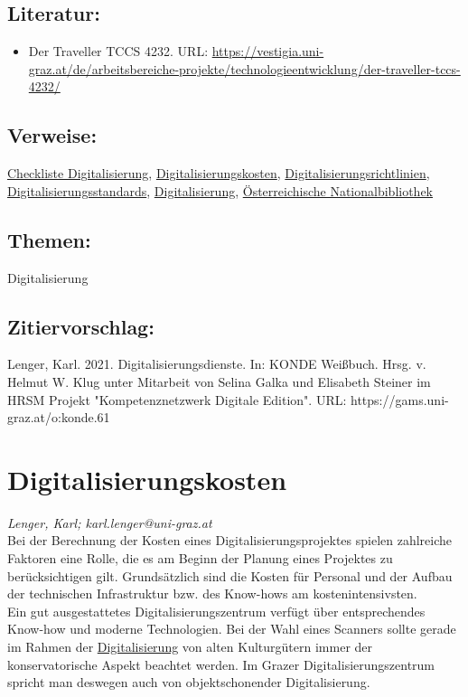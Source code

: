 \documentclass{article}
\begin{document}
        \subsection*{Literatur:}\begin{itemize}\item Der Traveller TCCS 4232. URL: \url{https://vestigia.uni-graz.at/de/arbeitsbereiche-projekte/technologieentwicklung/der-traveller-tccs-4232/}\end{itemize}\subsection*{Verweise:}\href{https://gams.uni-graz.at/o:konde.40}{Checkliste Digitalisierung}, \href{https://gams.uni-graz.at/o:konde.62}{Digitalisierungskosten}, \href{https://gams.uni-graz.at/o:konde.63}{Digitalisierungsrichtlinien}, \href{https://gams.uni-graz.at/o:konde.64}{Digitalisierungsstandards}, \href{https://gams.uni-graz.at/o:konde.60}{Digitalisierung}, \href{https://gams.uni-graz.at/o:konde.153}{Österreichische Nationalbibliothek}\subsection*{Themen:}Digitalisierung\subsection*{Zitiervorschlag:}Lenger, Karl. 2021. Digitalisierungsdienste. In: KONDE Weißbuch. Hrsg. v. Helmut W. Klug unter Mitarbeit von Selina Galka und Elisabeth Steiner im HRSM Projekt "Kompetenznetzwerk Digitale Edition". URL: https://gams.uni-graz.at/o:konde.61\newpage\section*{Digitalisierungskosten} \emph{Lenger, Karl; karl.lenger@uni-graz.at }\\
        
    Bei der Berechnung der Kosten eines Digitalisierungsprojektes spielen zahlreiche
                  Faktoren eine Rolle, die es am Beginn der Planung eines Projektes zu
                  berücksichtigen gilt. Grundsätzlich sind die Kosten für Personal und der Aufbau
                  der technischen Infrastruktur bzw. des Know-hows am kostenintensivsten. \\
            
        Ein gut ausgestattetes Digitalisierungszentrum verfügt über entsprechendes
                  Know-how und moderne Technologien. Bei der Wahl eines Scanners sollte gerade im
                  Rahmen der \href{http://gams.uni-graz.at/o:konde.60}{Digitalisierung} von
                  alten Kulturgütern immer der konservatorische Aspekt beachtet werden. Im Grazer
                  Digitalisierungszentrum spricht man deswegen auch von objektschonender
                  Digitalisierung. \\
            
\end{document}
